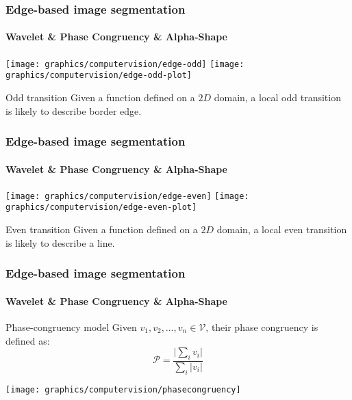 
    \begin{frame}
        \frametitle{Edge-based image segmentation}
        \framesubtitle{Wavelet \& Phase Congruency \& Alpha-Shape}
        \texttt{[image: graphics/computervision/edge-odd]}
        \texttt{[image: graphics/computervision/edge-odd-plot]}
        \begin{exampleblock}{Odd transition}
            Given a function defined on a $2D$ domain, a local odd transition is likely to describe border edge.
        \end{exampleblock}
    \end{frame}

    \begin{frame}
        \frametitle{Edge-based image segmentation}
        \framesubtitle{Wavelet \& Phase Congruency \& Alpha-Shape}
        \texttt{[image: graphics/computervision/edge-even]}
        \texttt{[image: graphics/computervision/edge-even-plot]}
        \begin{exampleblock}{Even transition}
            Given a function defined on a $2D$ domain, a local even transition is likely to describe a line.
        \end{exampleblock}
    \end{frame}
    
    \begin{frame}
        \frametitle{Edge-based image segmentation}
        \framesubtitle{Wavelet \& Phase Congruency \& Alpha-Shape}
            \begin{block}{Phase-congruency model}
                Given $v_1, v_2, \ldots, v_n \in \mathcal{V}$, their phase congruency is defined as:
                \begin{equation}
                    \mathcal{P} = \frac{\lvert \sum_{i} v_i \rvert}{\sum_{i} \lvert v_i \rvert}
                \end{equation}
            \end{block}
            \centering
            \texttt{[image: graphics/computervision/phasecongruency]}
    \end{frame}

